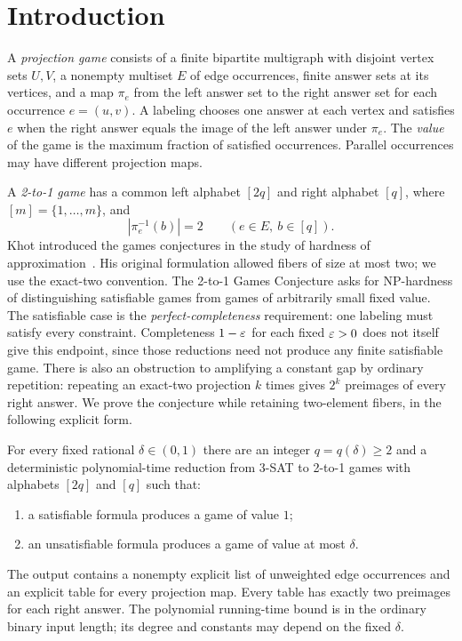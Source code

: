 \section{Introduction}\label{sec:introduction}

A \emph{projection game} consists of a finite bipartite multigraph with disjoint
vertex sets $U,V$, a nonempty multiset $E$ of edge occurrences, finite answer
sets at its vertices, and a map $\pi_e$ from the left answer set to the right
answer set for each occurrence $e=(u,v)$.
A labeling chooses one answer at each vertex and satisfies $e$ when the right
answer equals the image of the left answer under $\pi_e$.
The \emph{value} of the game is the maximum fraction of satisfied occurrences.
Parallel occurrences may have different projection maps.

A \emph{2-to-1 game} has a common left alphabet $[2q]$ and right alphabet $[q]$,
where $[m]=\{1,\ldots,m\}$, and
\[
             |\pi_e^{-1}(b)|=2
        \qquad(e\in E,\ b\in[q]).
\]
Khot introduced the games conjectures in the study of hardness of
approximation~\cite{Khot2002}.  His original formulation allowed fibers
of size at most two; we use the exact-two convention.  The 2-to-1 Games
Conjecture asks for
NP-hardness of distinguishing satisfiable games from games of arbitrarily
small fixed value.  The satisfiable case is the \emph{perfect-completeness}
requirement: one labeling must satisfy every constraint.  Completeness
$1-\varepsilon$ for each fixed $\varepsilon>0$ does not itself give this endpoint, since
those reductions need not produce any finite satisfiable game.
There is also an obstruction to amplifying a constant gap by ordinary
repetition: repeating an exact-two projection $k$ times gives $2^k$
preimages of every right answer.  We prove the conjecture while retaining
two-element fibers, in the following explicit form.

\begin{theorem}\label{thm:main}
For every fixed rational $\delta\in(0,1)$ there are an integer $q=q(\delta)\ge2$
and a deterministic polynomial-time reduction from $3$-SAT to 2-to-1 games
with alphabets $[2q]$ and $[q]$ such that:
\begin{enumerate}[label=\textup{(\roman*)}]
\item a satisfiable formula produces a game of value $1$;
\item an unsatisfiable formula produces a game of value at most $\delta$.
\end{enumerate}
The output contains a nonempty explicit list of unweighted edge occurrences
and an explicit table for every projection map.
Every table has exactly two preimages for each right answer.
The polynomial running-time bound is in the ordinary binary input length;
its degree and constants may depend on the fixed $\delta$.
\end{theorem}

